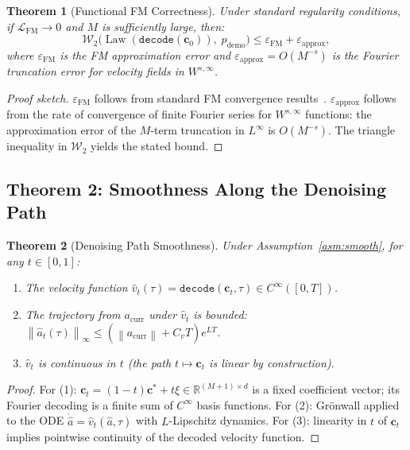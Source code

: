 \documentclass[11pt]{article}
\theoremstyle{plain}
\newtheorem{theorem}{Theorem}[section]
\theoremstyle{definition}
\newcommand{\R}{\mathbb{R}}
\newcommand{\cL}{\mathcal{L}}
\newcommand{\norm}[1]{\left\lVert#1\right\rVert}
\newcommand{\acurr}{a_{\mathrm{curr}}}
\newcommand{\tdiff}{t}
\newcommand{\texec}{\tau}
\newcommand{\ccoeff}{\mathbf{c}}
\newcommand{\cclean}{\ccoeff^*}
\newcommand{\cnoisy}{\ccoeff_\tdiff}
\DeclareMathOperator{\Law}{Law}
\begin{document}
\begin{theorem}[Functional FM Correctness]
\label{thm:funcfm}
Under standard regularity conditions, if $\cL_{\mathrm{FM}} \to 0$ and
$M$ is sufficiently large, then:
\begin{equation}
  \mathcal{W}_2\!\bigl(\Law(\texttt{decode}(\ccoeff_0)),\;p_{\mathrm{demo}}\bigr)
  \leq \varepsilon_{\mathrm{FM}} + \varepsilon_{\mathrm{approx}},
\end{equation}
where $\varepsilon_{\mathrm{FM}}$ is the FM approximation error and
$\varepsilon_{\mathrm{approx}} = O(M^{-s})$ is the Fourier truncation
error for velocity fields in $W^{s,\infty}$.
\end{theorem}

\begin{proof}[Proof sketch]
$\varepsilon_{\mathrm{FM}}$ follows from standard FM convergence
results~\cite{lipman2022flow}.
$\varepsilon_{\mathrm{approx}}$ follows from the rate of convergence of
finite Fourier series for $W^{s,\infty}$ functions: the approximation
error of the $M$-term truncation in $L^\infty$ is $O(M^{-s})$.
The triangle inequality in $\mathcal{W}_2$ yields the stated bound.
\end{proof}

\subsection{Theorem 2: Smoothness Along the Denoising Path}

\begin{theorem}[Denoising Path Smoothness]
\label{thm:smooth}
Under Assumption~\ref{asm:smooth}, for any $\tdiff \in [0,1]$:
\begin{enumerate}[leftmargin=2em,noitemsep]
  \item The velocity function
    $\hat{v}_\tdiff(\texec) = \texttt{decode}(\cnoisy, \texec) \in C^\infty([0,T])$.
  \item The trajectory from $\acurr$ under $\hat{v}_\tdiff$ is bounded:
    $\norm{\hat{a}_\tdiff(\texec)}_\infty \leq (\norm{\acurr} + C_v T)e^{LT}$.
  \item $\hat{v}_\tdiff$ is continuous in $\tdiff$ (the path
    $t \mapsto \cnoisy$ is linear by construction).
\end{enumerate}
\end{theorem}

\begin{proof}
For (1): $\cnoisy = (1-\tdiff)\cclean + \tdiff\xi \in \R^{(M+1)\times d}$
is a fixed coefficient vector; its Fourier decoding is a finite sum of
$C^\infty$ basis functions.
For (2): Gr\"{o}nwall applied to the ODE $\dot{\hat{a}} = \hat{v}_\tdiff(\hat{a}, \texec)$
with $L$-Lipschitz dynamics.
For (3): linearity in $\tdiff$ of $\cnoisy$ implies pointwise continuity of
the decoded velocity function.
\end{proof}
\end{document}
